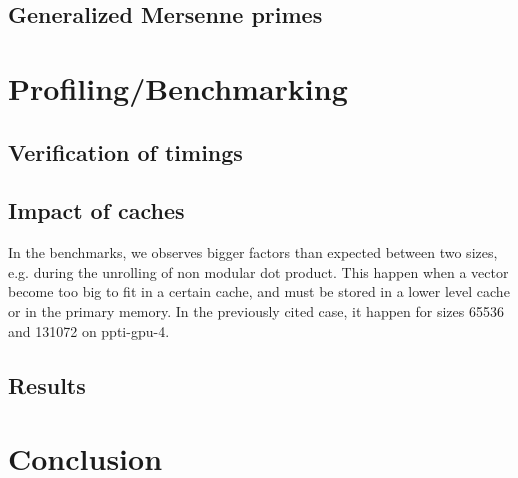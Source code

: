 \documentclass[a4paper]{article}
\begin{document}
\subsection{Generalized Mersenne primes}


\section{Profiling/Benchmarking}

\subsection{Verification of timings}

\subsection{Impact of caches} %

In the benchmarks, we observes bigger factors than expected between two sizes,
e.g. during the unrolling of non modular dot product. This happen when a vector
become too big to fit in a certain cache, and must be stored in a lower level
cache or in the primary memory. In the previously cited case, it happen for sizes
65536 and 131072 on ppti-gpu-4. %


\subsection{Results}

\section{Conclusion}



\newpage
 
 
\nocite{*}
\end{document}
